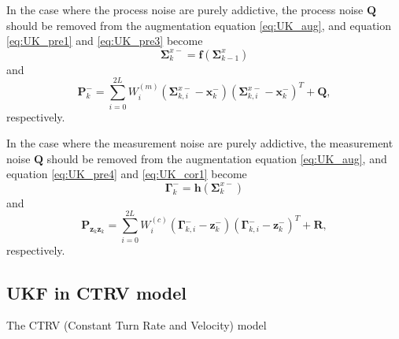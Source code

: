 \documentclass[12pt]{article}
\begin{document}
In the case where the process noise are purely addictive, the process noise \(\mathbf{Q}\) should be removed from the augmentation equation \ref{eq:UK_aug}, and equation \ref{eq:UK_pre1} and \ref{eq:UK_pre3} become
\begin{equation}
	\mathbf{\Sigma}_k^{x-} = \mathbf{f}( \mathbf{\Sigma}^x_{k-1})
\end{equation}
and
\begin{equation}
	\mathbf{P}_{k}^{-} = \sum_{i=0}^{2L}{W_i^{(m)}(\mathbf{\Sigma}^{x-}_{k,i} - 		\mathbf{x}_k^{-})(\mathbf{\Sigma}^{x-}_{k,i} - \mathbf{x}_k^{-})^T} + \mathbf{Q} ,
\end{equation}
respectively.

In the case where the measurement noise are purely addictive, the measurement noise \(\mathbf{Q}\) should be removed from the augmentation equation \ref{eq:UK_aug}, and equation \ref{eq:UK_pre4} and \ref{eq:UK_cor1} become
\begin{equation}
	\mathbf{\Gamma}_k^- = \mathbf{h}(\mathbf{\Sigma}_k^{x-})
\end{equation}
and
\begin{equation}
	\mathbf{P}_{\mathbf{z}_k \mathbf{z}_k} = \sum_{i=0}^{2L}{W_i^{(c)}(\mathbf{\Gamma}^{-}_{k,i} - \mathbf{z}_k^{-})(\mathbf{\Gamma}^{-}_{k,i} - \mathbf{z}_k^{-})^T} + \mathbf{R},
\end{equation}
respectively.

\subsection{UKF in CTRV model}

The CTRV (Constant Turn Rate and Velocity) model
\end{document}
